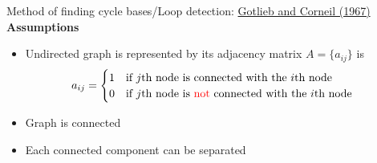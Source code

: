 \documentclass[xcolor=dvipsnames]{beamer}
\begin{document}
\begin{frame}{Method of finding cycle bases/Loop detection: \href{https://dl.acm.org/doi/pdf/10.1145/363848.363861}{Gotlieb and Corneil (1967)}}
	\textbf{Assumptions}
	\begin{itemize}
		\item Undirected graph is represented by its adjacency matrix $A=\{a_{ij}\}$ is
	\begin{align*}
		a_{ij} &= 
		\begin{cases}
			1 & \mbox{if $j$th node is connected with the $i$th node}\\
			0& \mbox{if $j$th node is {\color{red}not} connected with the $i$th node}\\
		\end{cases}
	\end{align*}

	\item Graph is connected
	\item Each connected component can be separated
	\end{itemize}
\end{frame}
\end{document}
